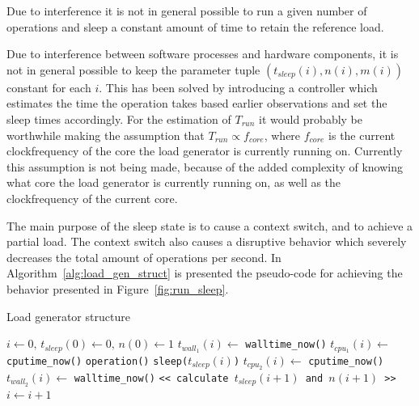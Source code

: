 \documentclass{article}
\begin{document}
Due to interference it is not in general possible to run a given
number of operations and sleep a constant amount of time to retain the
reference load.

Due to interference between software processes and hardware
components, it is not in general possible to keep the parameter tuple
$\left(t_{sleep}(i), n(i), m(i)\right)$ constant for each $i$. This
has been solved by introducing a controller which estimates the time
the operation takes based earlier observations and set the sleep times
accordingly. For the estimation of $T_{run}$ it would probably be
worthwhile making the assumption that $T_{run} \propto f_{core}$,
where $f_{core}$ is the current clockfrequency of the core the load
generator is currently running on. Currently this assumption is not
being made, because of the added complexity of knowing what core the
load generator is currently running on, as well as the clockfrequency
of the current core.

The main purpose of the sleep state is to cause a context switch, and
to achieve a partial load. The context switch also causes a disruptive
behavior which severely decreases the total amount of operations per
second. In Algorithm~\ref{alg:load_gen_struct} is presented the
pseudo-code for achieving the behavior presented in
Figure~\ref{fig:run_sleep}.

\begin{algorithm}
\caption{Load generator structure}
\label{alg:load_gen_struct}
\begin{algorithmic}
  \STATE $i \leftarrow 0,\,t_{sleep}(0) \leftarrow 0,\,n(0) \leftarrow 1$
  \LOOP
  \STATE $t_{wall_1}(i) \leftarrow$ \texttt{walltime\_now()}
  \STATE $t_{cpu_1}(i) \leftarrow$ \texttt{cputime\_now()}
      \STATE \texttt{operation()}
    \ENDFOR
    \STATE \texttt{sleep($t_{sleep}(i)$)}
  \ENDFOR
  \STATE $t_{cpu_2}(i) \leftarrow$ \texttt{cputime\_now()}
  \STATE $t_{wall_2}(i) \leftarrow$ \texttt{walltime\_now()}
  \STATE
  \STATE \texttt{<< calculate $t_{sleep}(i+1)$ and $n(i+1)$ >>}
  \STATE
  \STATE $i \leftarrow i + 1$
  \ENDLOOP
\end{algorithmic}
\end{algorithm}
\end{document}

